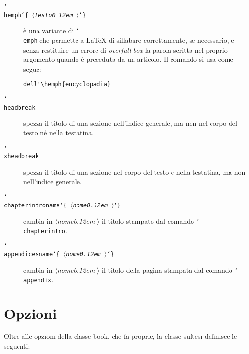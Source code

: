 \documentclass{suftesi}
\DeclareRobustCommand*{\cs}[1]{\texttt{\char`\\#1}}
\DeclareRobustCommand*{\ar}[1]{\texttt{\char`\{#1\char`\}}}
\DeclareRobustCommand*{\meta}[1]{%
  $\langle${\normalfont\itshape#1\kern0.12em }$\rangle$}
\DeclareRobustCommand*{\arm}[1]{\ar{\meta{#1}}}
\newcommand{\class}{\textsf}
\def\suftesi{\textsf{suftesi}}
\begin{document}
\begin{description}
\item [\cs{hemph}\arm{testo}]\mbox{}\par è una variante di \cs{emph} che permette a \LaTeX{} di sillabare correttamente, se necessario, e senza restituire un errore di \emph{overfull box} la parola scritta nel proprio argomento quando è preceduta da un articolo. Il comando si usa come segue:
\begin{verbatim}
dell'\hemph{encyclopædia}
\end{verbatim}
\item [\cs{headbreak}]\mbox{}\par spezza il titolo di una sezione nell'indice
  generale, ma non nel corpo del testo né nella testatina.
\item [\cs{xheadbreak}]\mbox{}\par spezza il titolo di una sezione nel corpo del
  testo e nella testatina, ma non nell'indice generale.
\item [\cs{chapterintroname}\arm{nome}] \mbox{}\par 
cambia in \meta{nome} il titolo stampato dal comando \cs{chapterintro}.
\item [\cs{appendicesname}\arm{nome}] \mbox{}\par 
cambia in \meta{nome} il titolo della pagina stampata dal comando \cs{appendix}.
\end{description}

\section{Opzioni}\label{sec:opzioni}

Oltre alle opzioni della classe \class{book}, che fa proprie, la
classe \suftesi{} definisce le seguenti:
\end{document}

